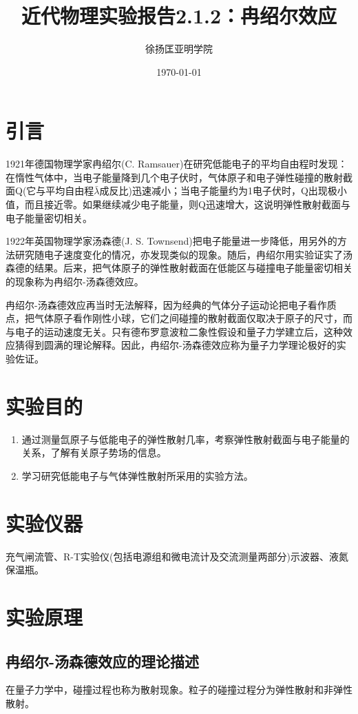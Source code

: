 \documentclass[a4paper]{article}
\title{近代物理实验报告2.1.2：冉绍尔效应}
\author{徐扬\quad 151242049\quad 匡亚明学院}
\date{\today}
\begin{document}
\maketitle

\section{引言}
1921年德国物理学家冉绍尔(C. Ramsauer)在研究低能电子的平均自由程时发现：在惰性气体中，当电子能量降到几个电子伏时，气体原子和电子弹性碰撞的散射截面Q(它与平均自由程$\bar{\lambda}$成反比)迅速减小；当电子能量约为1电子伏时，Q出现极小值，而且接近零。如果继续减少电子能量，则Q迅速增大，这说明弹性散射截面与电子能量密切相关。

1922年英国物理学家汤森德(J. S. Townsend)把电子能量进一步降低，用另外的方法研究随电子速度变化的情况，亦发现类似的现象。随后，冉绍尔用实验证实了汤森德的结果。后来，把气体原子的弹性散射截面在低能区与碰撞电子能量密切相关的现象称为冉绍尔-汤森德效应。

冉绍尔-汤森德效应再当时无法解释，因为经典的气体分子运动论把电子看作质点，把气体原子看作刚性小球，它们之间碰撞的散射截面仅取决于原子的尺寸，而与电子的运动速度无关。只有德布罗意波粒二象性假设和量子力学建立后，这种效应猜得到圆满的理论解释。因此，冉绍尔-汤森德效应称为量子力学理论极好的实验佐证。
\section{实验目的}
\begin{enumerate}
\item 通过测量氙原子与低能电子的弹性散射几率，考察弹性散射截面与电子能量的关系，了解有关原子势场的信息。
\item 学习研究低能电子与气体弹性散射所采用的实验方法。
\end{enumerate}
\section{实验仪器}
充气闸流管、R-T实验仪(包括电源组和微电流计及交流测量两部分)示波器、液氮保温瓶。
\section{实验原理}
\subsection{冉绍尔-汤森德效应的理论描述}
在量子力学中，碰撞过程也称为散射现象。粒子的碰撞过程分为弹性散射和非弹性散射。
\end{document}
